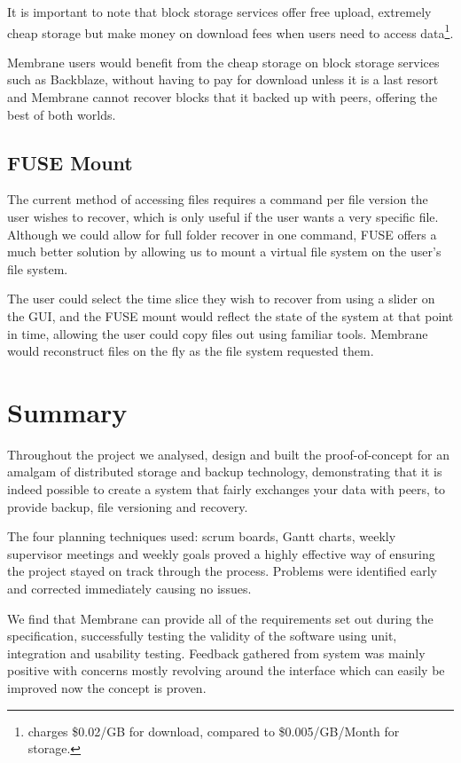 \documentclass[11pt, a4paper, twoside]{report}
\begin{document}
It is important to note that block storage services offer free upload, extremely cheap storage but make money on download fees when users need to access data\footnote{\citep{backblaze2017pricing} charges \$0.02/GB for download, compared to \$0.005/GB/Month for storage.}.  

Membrane users would benefit from the cheap storage on block storage services such as Backblaze, without having to pay for download unless it is a last resort and Membrane cannot recover blocks that it backed up with peers, offering the best of both worlds.

\subsection{FUSE Mount}

The current method of accessing files requires a command per file version the user wishes to recover, which is only useful if the user wants a very specific file. Although we could allow for full folder recover in one command, FUSE offers a much better solution by allowing us to mount a virtual file system on the user's file system.

The user could select the time slice they wish to recover from using a slider on the GUI, and the FUSE mount would reflect the state of the system at that point in time, allowing the user could copy files out using familiar tools. Membrane would reconstruct files on the fly as the file system requested them.

\section{Summary}

Throughout the project we analysed, design and built the proof-of-concept for an amalgam of distributed storage and backup technology, demonstrating that it is indeed possible to create a system that fairly exchanges your data with peers, to provide backup, file versioning and recovery.

The four planning techniques used: scrum boards, Gantt charts, weekly supervisor meetings and weekly goals proved a highly effective way of ensuring the project stayed on track through the process. Problems were identified early and corrected immediately causing no issues.

We find that Membrane can provide all of the requirements set out during the specification, successfully testing the validity of the software using unit, integration and usability testing. Feedback gathered from system was mainly positive with concerns mostly revolving around the interface which can easily be improved now the concept is proven.
\end{document}
